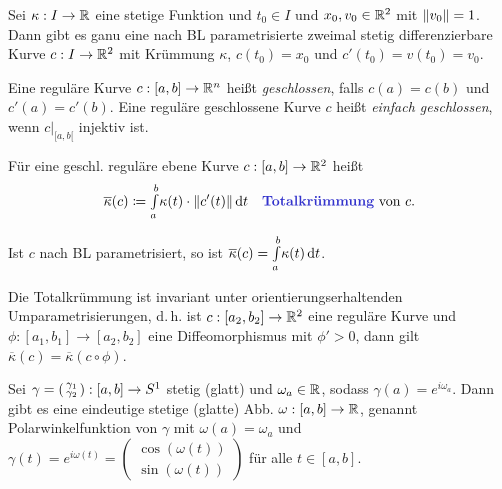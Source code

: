 \documentclass{cheat-sheet}
\newcommand{\Intabdt}[1]{\Int{a}{b}{#1}{t}}
\begin{document}
\begin{satz}
  Sei $\kappa : I \to \mathbb{R}$ eine stetige Funktion und $t_0 \in I$ und $x_0, v_0 \in \mathbb{R}^2$ mit $\lVert v_0\rVert = 1$. Dann gibt es ganu eine nach BL parametrisierte zweimal stetig differenzierbare Kurve $c : I \to \mathbb{R}^2$ mit Krümmung $\kappa$, $c(t_0) = x_0$ und $c'(t_0) = v(t_0) = v_0$.
\end{satz}

\begin{defn}
  Eine reguläre Kurve $c : [a, b] \to \mathbb{R}^n$ heißt \emph{geschlossen}, falls $c(a) = c(b)$ und $c'(a) = c'(b)$.
  Eine reguläre geschlossene Kurve $c$ heißt \emph{einfach geschlossen}, wenn $c|_{[a, b[}$ injektiv ist.
\end{defn}

\begin{defn}
  Für eine geschl. reguläre ebene Kurve $c : [a, b] \to \mathbb{R}^2$ heißt
  \[
    \overline{\kappa}(c) \coloneqq \Intabdt{\kappa(t) \cdot \norm{c'(t)}}
    \quad \text{\emph{Totalkrümmung} von $c$.}
  \]
\end{defn}

\begin{bem}
  Ist $c$ nach BL parametrisiert, so ist $\overline{\kappa}(c) = \Intabdt{\kappa(t)}$.
\end{bem}

\begin{satz}
  Die Totalkrümmung ist invariant unter orientierungserhaltenden Umparametrisierungen, d.\,h. ist $c : [a_2, b_2] \to \mathbb{R}^2$ eine reguläre Kurve und $\phi : [a_1, b_1] \to [a_2, b_2]$ eine Diffeomorphismus mit $\phi' > 0$, dann gilt $\overline\kappa(c) = \overline\kappa(c \circ \phi)$.
\end{satz}

\begin{satz}
  Sei $\gamma = \begin{psmallmatrix} \gamma_1 \\ \gamma_2 \end{psmallmatrix} : [a, b] \to S^1$ stetig (glatt) und $\omega_a \in \mathbb{R}$, sodass $\gamma(a) = e^{i \omega_a}$. Dann gibt es eine eindeutige stetige (glatte) Abb. $\omega : [a, b] \to \mathbb{R}$, genannt Polarwinkelfunktion von $\gamma$ mit $\omega(a) = \omega_a$ und $\gamma(t) = e^{i \omega(t)} = \begin{pmatrix} \cos(\omega(t)) \\ \sin(\omega(t)) \end{pmatrix}$ für alle $t \in [a, b]$.
\end{satz}
\end{document}
